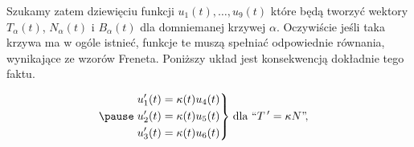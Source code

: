 Szukamy zatem dziewięciu funkcji $u_1(t),\ldots,u_9(t)$ które będą tworzyć wektory $T_\alpha(t)$, $N_\alpha(t)$ i $B_\alpha(t)$ dla domniemanej krzywej $\alpha$. Oczywiście jeśli taka krzywa ma w ogóle istnieć, funkcje te muszą spełniać odpowiednie równania, wynikające ze wzorów Freneta. Poniższy układ jest konsekwencją dokładnie tego faktu.

\begin{frame}[<+->]


\vspace*{-0.2in}
\begin{align*}
\pause\left.\begin{aligned}      
u_1'(t)&=\kappa(t)u_4(t)\\
u_2'(t)&=\kappa(t)u_5(t)\\
u_3'(t)&=\kappa(t)u_6(t)
\end{aligned}\right\}&\;\text{dla }``T\,'=\kappa N\text{''}\!,\quad\\

\end{align*}
\end{frame}
